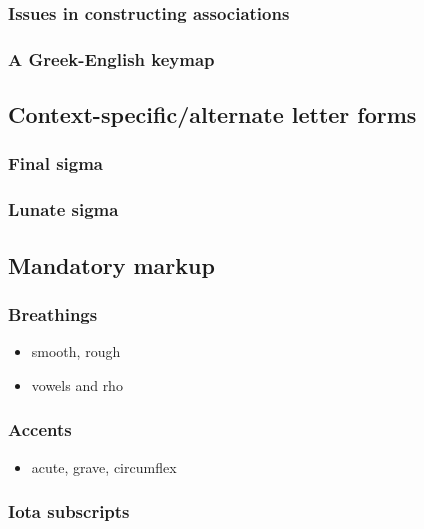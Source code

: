 \documentclass[11pt]{article}
\begin{document}
\subsubsection{Issues in constructing associations}
\label{sec:org2958ac6}

\subsubsection{A Greek-English keymap}
\label{sec:org073f05d}

\subsection{Context-specific/alternate letter forms}
\label{sec:org7d21ba4}

\subsubsection{Final sigma}
\label{sec:org4969c7b}

\subsubsection{Lunate sigma}
\label{sec:orgee08a2e}

\subsection{Mandatory markup}
\label{sec:orga37f9c9}

\subsubsection{Breathings}
\label{sec:org330c2a9}

\begin{itemize}
\item smooth, rough
\item vowels and rho
\end{itemize}

\subsubsection{Accents}
\label{sec:org6ec787c}

\begin{itemize}
\item acute, grave, circumflex
\end{itemize}

\subsubsection{Iota subscripts}
\label{sec:org792c01b}
\end{document}
